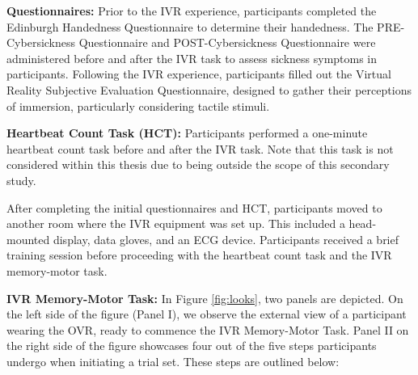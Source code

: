 \documentclass[12pt,oneside,openright]{report}
\begin{document}
\textbf{Questionnaires:} Prior to the IVR experience, participants completed the Edinburgh Handedness Questionnaire to determine their handedness. The PRE-Cybersickness Questionnaire and POST-Cybersickness Questionnaire were administered before and after the IVR task to assess sickness symptoms in participants. Following the IVR experience, participants filled out the Virtual Reality Subjective Evaluation Questionnaire, designed to gather their perceptions of immersion, particularly considering tactile stimuli. 

\textbf{Heartbeat Count Task (HCT):} Participants performed a one-minute heartbeat count task before and after the IVR task. Note that this task is not considered within this thesis due to being outside the scope of this secondary study.

After completing the initial questionnaires and HCT, participants moved to another room where the IVR equipment was set up. This included a head-mounted display, data gloves, and an ECG device. Participants received a brief training session before proceeding with the heartbeat count task and the IVR memory-motor task.

\textbf{IVR Memory-Motor Task:} In Figure \ref{fig:looks}, two panels are depicted. On the left side of the figure (Panel I), we observe the external view of a participant wearing the OVR, ready to commence the IVR Memory-Motor Task. Panel II on the right side of the figure showcases four out of the five steps participants undergo when initiating a trial set. These steps are outlined below:
\end{document}
